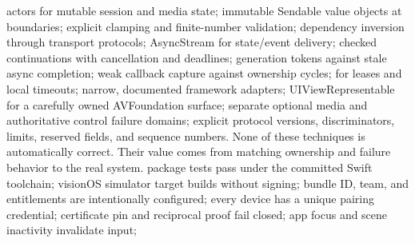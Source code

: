 \markdownRendererUlItem actors for mutable session and media state;\markdownRendererUlItemEnd 
\markdownRendererUlItem immutable Sendable value objects at boundaries;\markdownRendererUlItemEnd 
\markdownRendererUlItem explicit clamping and finite-number validation;\markdownRendererUlItemEnd 
\markdownRendererUlItem dependency inversion through transport protocols;\markdownRendererUlItemEnd 
\markdownRendererUlItem AsyncStream for state/event delivery;\markdownRendererUlItemEnd 
\markdownRendererUlItem checked continuations with cancellation and deadlines;\markdownRendererUlItemEnd 
\markdownRendererUlItem generation tokens against stale async completion;\markdownRendererUlItemEnd 
\markdownRendererUlItem weak callback capture against ownership cycles;\markdownRendererUlItemEnd 
\markdownRendererUlItem {} for leases and local timeouts;\markdownRendererUlItemEnd 
\markdownRendererUlItem narrow, documented  framework adapters;\markdownRendererUlItemEnd 
\markdownRendererUlItem UIViewRepresentable for a carefully owned AVFoundation surface;\markdownRendererUlItemEnd 
\markdownRendererUlItem separate optional media and authoritative control failure domains;\markdownRendererUlItemEnd 
\markdownRendererUlItem explicit protocol versions, discriminators, limits, reserved fields, and sequence numbers.\markdownRendererUlItemEnd 
\markdownRendererUlEnd \markdownRendererInterblockSeparator
{}None of these techniques is automatically correct. Their value comes from matching ownership and failure behavior to the real system.\markdownRendererInterblockSeparator
{}
\markdownRendererSectionEnd \markdownRendererSectionBegin
{}\markdownRendererInterblockSeparator
{}\markdownRendererUlBegin
\markdownRendererUlItem \markdownRendererUntickedBox{} package tests pass under the committed Swift toolchain;\markdownRendererUlItemEnd 
\markdownRendererUlItem \markdownRendererUntickedBox{} visionOS simulator target builds without signing;\markdownRendererUlItemEnd 
\markdownRendererUlItem \markdownRendererUntickedBox{} bundle ID, team, and entitlements are intentionally configured;\markdownRendererUlItemEnd 
\markdownRendererUlItem \markdownRendererUntickedBox{} every device has a unique pairing credential;\markdownRendererUlItemEnd 
\markdownRendererUlItem \markdownRendererUntickedBox{} certificate pin and reciprocal proof fail closed;\markdownRendererUlItemEnd 
\markdownRendererUlItem \markdownRendererUntickedBox{} app focus and scene inactivity invalidate input;\markdownRendererUlItemEnd 
